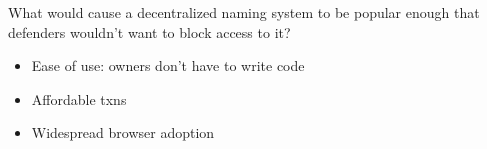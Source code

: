 \documentclass[10pt,sigconf,letterpaper]{acmart}
\begin{document}
What would cause a decentralized naming system to be popular enough that 
defenders wouldn't want to block access to it?
\begin{itemize}
	\item Ease of use: owners don't have to write code
	\item Affordable txns
	\item Widespread browser adoption
\end{itemize}

%
%
%
%
%
%
%
\end{document}
